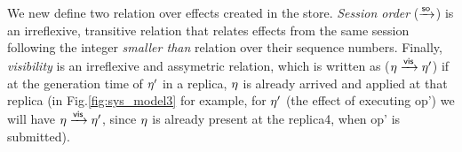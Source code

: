 We new define two relation over effects created in the store.
\emph{Session order} ($\xrightarrow{{\normalfont \textsf{so}}}$) is an irreflexive, transitive relation that relates
effects from the same session following the  integer \emph{smaller than} relation
over their sequence numbers.
Finally, \emph {visibility} is an
irreflexive and assymetric relation, which is written as ($\eta
\xrightarrow{{\normalfont \textsf{vis}}} \eta'$) if at the generation time of $\eta'$ in a
replica, $\eta$ is
already arrived and applied at that replica (in Fig.\ref{fig:sys_model3} for example, for $\eta'$ (the effect of executing
op') we will have $\eta \xrightarrow{{\normalfont \textsf{vis}}} \eta'$, since $\eta$ is
already present at the replica4, when op' is submitted).




















\newpage































































